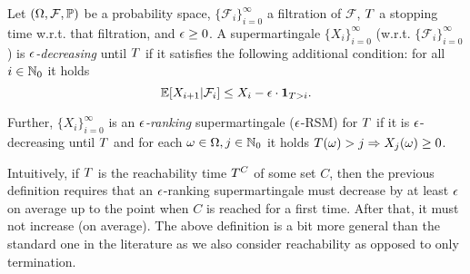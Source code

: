 \smallskip
\begin{definition}
\label{def:ranking}
Let $(\Omega,\mathcal{F},\mathbb{P})$ be a probability space, 
$\{\mathcal{F}_i\}_{i=0}^{\infty}$ a filtration of $\mathcal{F}$, $T$ a 
stopping time w.r.t. that filtration, and $\epsilon\geq 
0$. 
A supermartingale $\{X_i\}_{i=0}^{\infty}$ (w.r.t. 
$\{\mathcal{F}_i\}_{i=0}^{\infty}$) is \emph{$\epsilon$-decreasing} until 
$T$ 
if it 
satisfies 
the following additional condition: for all $i\in \mathbb{N}_0$ it holds
\begin{equation}
\label{eq:ranking-sup}
\mathbb{E}[X_{i+1}|\mathcal{F}_i] \leq X_i - \epsilon\cdot\mathbf{1}_{T > i}.
\end{equation}

Further, $\{X_i\}_{i=0}^{\infty}$ is an \emph{$\epsilon$-ranking} supermartingale 
($\epsilon$-RSM) for $T$ if it 
is $\epsilon$-decreasing until $T$ and for 
each $\omega\in\Omega, j\in\mathbb{N}_0$ it holds $T(\omega)>j \Rightarrow 
X_j(\omega)\geq 0$.
\end{definition}
Intuitively, if $T$ is the reachability time $T^{C}$ of some set $C$, 
then the previous definition requires that an $\epsilon$-ranking supermartingale 
must decrease by at least $\epsilon$ on average up to the point when $C$ is 
reached for a first time. After that, it must not increase (on average).
The above definition is a bit more general than the standard one in the
literature as we also consider reachability as opposed to only termination.





